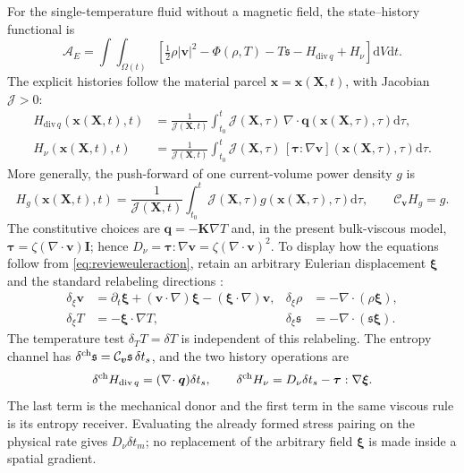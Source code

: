 \documentclass[11pt,a4paper]{article}
\theoremstyle{remark}\newtheorem{remark}{Remark}
\numberwithin{equation}{section}
\newcommand{\dd}{\mathrm{d}}
\newcommand{\vv}{\boldsymbol v}
\newcommand{\xx}{\boldsymbol x}
\newcommand{\XX}{\boldsymbol X}
\newcommand{\xii}{\boldsymbol\xi}
\newcommand{\ttau}{\boldsymbol\tau}
\newcommand{\Id}{\boldsymbol I}
\newcommand{\qv}{\boldsymbol q}
\newcommand{\grad}{\nabla}
\newcommand{\diver}{\nabla\!\cdot}
\newcommand{\Cv}{\mathcal C_{\vv}}
\newcommand{\st}{\mathfrak s}
\begin{document}
For the single-temperature fluid without a magnetic field, the state--history functional is
\begin{equation}
\mathscr A_E=\int\!\int_{\Omega(t)}
\left[\tfrac12\rho|\vv|^2-\Phi(\rho,T)-T\st
-H_{\mathrm{div}\,q}+H_\nu\right]\dd V\dd t.
\label{eq:revieweuleraction}
\end{equation}
The explicit histories follow the material parcel $\xx=\xx(\XX,t)$, with Jacobian $\mathcal J>0$:
\begin{equation}
\begin{aligned}
H_{\mathrm{div}\,q}(\xx(\XX,t),t)
&=\frac1{\mathcal J(\XX,t)}\int_{t_0}^{t}
\mathcal J(\XX,\tau)\,\diver\qv(\xx(\XX,\tau),\tau)\dd\tau,\\
H_\nu(\xx(\XX,t),t)
&=\frac1{\mathcal J(\XX,t)}\int_{t_0}^{t}
\mathcal J(\XX,\tau)\,[\ttau:\grad\vv](\xx(\XX,\tau),\tau)\dd\tau.
\end{aligned}
\label{eq:revieweulerhistories}
\end{equation}
More generally, the push-forward of one current-volume power density $g$ is
\begin{equation}
H_g(\xx(\XX,t),t)
=\frac1{\mathcal J(\XX,t)}\int_{t_0}^{t}
\mathcal J(\XX,\tau)g(\xx(\XX,\tau),\tau)\dd\tau,
\qquad \mathcal C_{\vv}H_g=g.
\label{eq:reviewtransport}
\end{equation}
The constitutive choices are $\qv=-\boldsymbol K\grad T$ and, in the present bulk-viscous model, $\ttau=\zeta(\diver\vv)\Id$; hence $D_\nu=\ttau:\grad\vv=\zeta(\diver\vv)^2$. To display how the equations follow from \eqref{eq:revieweuleraction}, retain an arbitrary Eulerian displacement $\xii$ and the standard relabeling directions \citep{Holm1998,RenEulerian}:
\begin{equation}
\begin{aligned}
\delta_\xi\vv&=\partial_t\xii+(\vv\cdot\grad)\xii-(\xii\cdot\grad)\vv,&
\delta_\xi\rho&=-\diver(\rho\xii),\\
\delta_\xi T&=-\xii\cdot\grad T,&
\delta_\xi\st&=-\diver(\st\xii).
\end{aligned}
\label{eq:revieweulervariations}
\end{equation}
The temperature test $\delta_T T=\delta T$ is independent of this relabeling. The entropy channel has $\delta^{\rm ch}\st=\Cv\st\,\delta t_s$, and the two history operations are
\begin{equation}
\delta^{\rm ch}H_{\mathrm{div}\,q}=(\diver\qv)\delta t_s,
\qquad
\delta^{\rm ch}H_\nu=D_\nu\delta t_s-\ttau:\grad\xii.
\label{eq:revieweulerspending}
\end{equation}
The last term is the mechanical donor and the first term in the same viscous rule is its entropy receiver. Evaluating the already formed stress pairing on the physical rate gives $D_\nu\delta t_m$; no replacement of the arbitrary field $\xii$ is made inside a spatial gradient.
\end{document}
